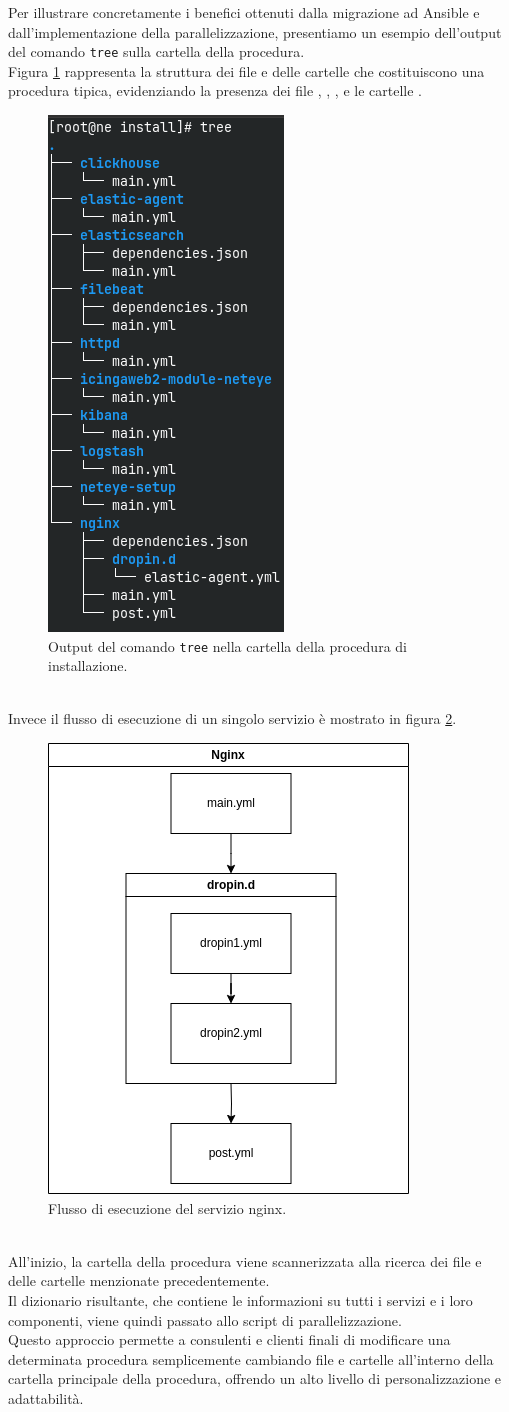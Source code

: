 Per illustrare concretamente i benefici ottenuti dalla migrazione ad Ansible e dall'implementazione
della parallelizzazione, presentiamo un esempio dell'output del comando \texttt{tree}
sulla cartella della procedura.\\ Figura \ref{fig:struttura_file_install} rappresenta
la struttura dei file e delle cartelle che costituiscono una procedura tipica,
evidenziando la presenza dei file , , ,
e le cartelle .
\begin{figure}[ht]
  \centering
  \includegraphics[width=.3\textwidth]{images/tree_install.png}
  \caption{Output del comando \texttt{tree} nella cartella della procedura di installazione.}
  \label{fig:struttura_file_install}
\end{figure}\\ Invece il flusso di esecuzione di un singolo servizio è mostrato in
figura \ref{fig:nginx_flusso}.
\begin{figure}[ht!]
  \centering
  \includegraphics[width=.3\textwidth]{images/single_service_flow.png}
  \caption{Flusso di esecuzione del servizio nginx.}
  \label{fig:nginx_flusso}
\end{figure}\\ All'inizio, la cartella della procedura viene scannerizzata alla
ricerca dei file e delle cartelle menzionate precedentemente.\\ Il dizionario
risultante, che contiene le informazioni su tutti i servizi e i loro componenti,
viene quindi passato allo script di parallelizzazione.\\ Questo approccio
permette a consulenti e clienti finali di modificare una determinata procedura
semplicemente cambiando file e cartelle all'interno della cartella principale
della procedura, offrendo un alto livello di personalizzazione e adattabilità.

